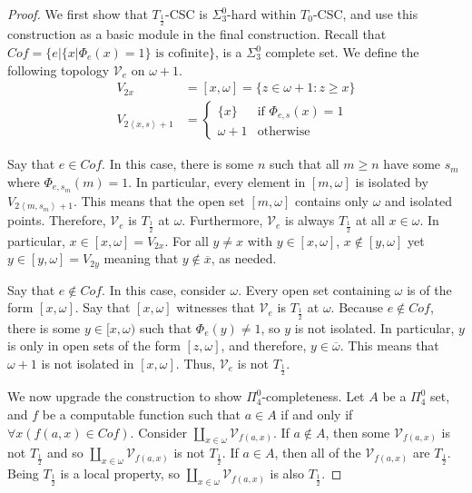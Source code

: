 \documentclass[11pt]{amsart}
\theoremstyle{remark}
\begin{document}
    \begin{proof}
        We first show that $T_{\frac12}$-CSC is $\Sigma_3^0$-hard within $T_0$-CSC, and use this construction as a basic module in the final construction.
        Recall that $Cof=\{e\vert \{x\vert \Phi_e(x)=1\} \text{ is cofinite}\}$, is a $\Sigma_3^0$ complete set.
        We define the following topology $\mathcal{V}_e$ on $\omega+1$.
        \begin{align*}
        V_{2x} &= [x, \omega] = \{z \in \omega+1 : z \geq x\}\\
        V_{2\left\langle x, s \right\rangle + 1} &= \begin{cases}
            \{x\} & \text{if } \Phi_{e, s}(x)=1\\
            \omega+1 & \text{otherwise}
        \end{cases}
        \end{align*}
        
        Say that $e\in Cof$.
        In this case, there is some $n$ such that all $m\geq n$ have some $s_m$ where $\Phi_{e, s_m}(m)=1$.
        In particular, every element in $[m,\omega]$ is isolated by $V_{2\left\langle m, s_m \right\rangle + 1}$.
        This means that the open set $[m, \omega]$ contains only $\omega$ and isolated points.
        Therefore, $\mathcal{V}_e$ is $T_{\frac12}$ at $\omega$.
        Furthermore, $\mathcal{V}_e$ is always $T_{\frac12}$ at all $x\in\omega$.
        In particular, $x\in[x, \omega] = V_{2x}$.
        For all $y\neq x$ with $y\in[x, \omega]$, $x\notin [y,\omega]$ yet $y\in [y,\omega] = V_{2y}$ meaning that $y\notin \overline{x}$, as needed.

        Say that $e\notin Cof$.
        In this case, consider $\omega$.
        Every open set containing $\omega$ is of the form $[x, \omega]$.
        Say that $[x, \omega]$ witnesses that $\mathcal{V}_e$ is $T_{\frac12}$ at $\omega$.
        Because $e\notin Cof$, there is some $y\in [x, \omega)$ such that $\Phi_e(y) \neq 1$, so $y$ is not isolated.
        In particular, $y$ is only in open sets of the form $[z, \omega]$, and therefore, $y\in\overline{\omega}$.
        This means that $\omega+1$ is not isolated in $[x, \omega]$.
        Thus, $\mathcal{V}_e$ is not $T_{\frac12}$.

        We now upgrade the construction to show $\Pi_4^0$-completeness.
        Let $A$ be a $\Pi^0_4$ set, and $f$ be a computable function such that $a \in A$ if and only if $\forall x (f(a, x) \in Cof)$.
        Consider $\coprod_{x\in\omega} \mathcal{V}_{f(a,x)}$.
        If $a\notin A$, then some $\mathcal{V}_{f(a,x)}$ is not $T_{\frac12}$ and so $\coprod_{x\in\omega} \mathcal{V}_{f(a,x)}$ is not $T_{\frac12}$.
        If $a\in A$, then all of the $\mathcal{V}_{f(a,x)}$ are $T_{\frac12}$.
        Being $T_{\frac12}$ is a local property, so $\coprod_{x\in\omega} \mathcal{V}_{f(a,x)}$ is also $T_{\frac12}$. 
    \end{proof}
\end{document}
